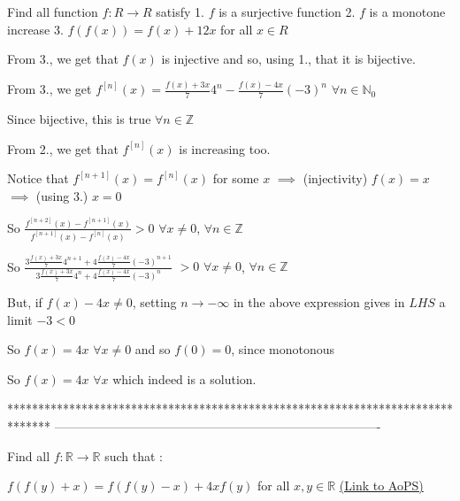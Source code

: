 \begin{solution}
	\begin{tcolorbox}Find all function $f: R \rightarrow  R$ satisfy
1. $f$ is a surjective function
2. $f$ is a monotone increase
3. $f(f(x))=f(x)+12x$ for all $x \in R$\end{tcolorbox}
From 3., we get that $f(x)$ is injective and so, using 1., that it is bijective.

From 3., we get $f^{[n]}(x)=\frac{f(x)+3x}74^n-\frac{f(x)-4x}7(-3)^n$ $\forall n\in\mathbb N_0$

Since bijective, this is true $\forall n\in \mathbb Z$

From 2., we get that $f^{[n]}(x)$ is increasing too.

Notice that $f^{[n+1]}(x)=f^{[n]}(x)$ for some $x$ $\implies$ (injectivity) $f(x)=x$ $\implies$ (using 3.) $x=0$

So $\frac{f^{[n+2]}(x)-f^{[n+1]}(x)}{f^{[n+1]}(x)-f^{[n]}(x)}>0$ $\forall x\ne 0$, $\forall n\in\mathbb Z$

So $\frac{3\frac{f(x)+3x}74^{n+1}+4\frac{f(x)-4x}7(-3)^{n+1}}{3\frac{f(x)+3x}74^{n}+4\frac{f(x)-4x}7(-3)^{n}}$ $>0$ $\forall x\ne 0$, $\forall n\in\mathbb Z$

But, if $f(x)-4x\ne 0$, setting $n\to-\infty$ in the above expression gives in $LHS$ a limit $-3<0$

So $f(x)=4x$ $\forall x\ne 0$ and so $f(0)=0$, since monotonous

So $\boxed{f(x)=4x}$ $\forall x$ which indeed is a solution.
\end{solution}
*******************************************************************************
-------------------------------------------------------------------------------

\begin{problem}
	Find all $f : \mathbb{R} \rightarrow \mathbb{R}$ such that :

$f(f(y) + x) = f(f(y) - x) + 4xf(y)$ for all $x, y \in \mathbb{R}$
	\flushright \href{https://artofproblemsolving.com/community/c6h485016}{(Link to AoPS)}
\end{problem}



